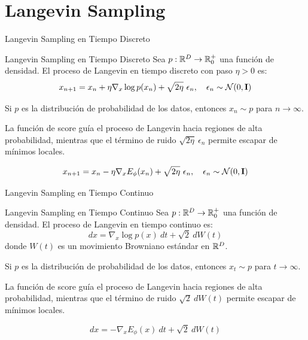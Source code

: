 \documentclass{beamer}
\begin{document}
\section{Langevin Sampling}

\begin{frame}{Langevin Sampling en Tiempo Discreto}
    \begin{definitionblock}{Langevin Sampling en Tiempo Discreto}
        Sea $p:\mathbb{R}^D\to \mathbb{R}^+_0$ una función de densidad. El proceso de Langevin en tiempo discreto con paso $\eta>0$ es:
        \begin{equation*}
            x_{n+1} = x_n + \eta \nabla_x \log p(x_n) + \sqrt{2\eta}\ \epsilon_n, \quad \epsilon_n\sim \mathcal{N}(0, \mathbf{I})
        \end{equation*}
    \end{definitionblock}
    
    Si $p$ es la distribución de probabilidad de los datos, entonces $x_n\sim p$ para $n\to \infty$.\pause

    La función de score guía el proceso de Langevin hacia regiones de alta probabilidad, mientras que el término de ruido $\sqrt{2\eta}\ \epsilon_n$ permite escapar de mínimos locales.\pause

    \begin{equation*}
        x_{n+1} = x_n - \eta \nabla_x E_\phi(x_n) + \sqrt{2\eta}\ \epsilon_n, \quad \epsilon_n\sim \mathcal{N}(0, \mathbf{I})
    \end{equation*}
    
\end{frame}

\begin{frame}{Langevin Sampling en Tiempo Continuo}
    \begin{definitionblock}{Langevin Sampling en Tiempo Continuo}
        Sea $p:\mathbb{R}^D\to \mathbb{R}^+_0$ una función de densidad. El proceso de Langevin en tiempo continuo es:
        \begin{equation*}
            dx = \nabla_x \log p(x)\ dt + \sqrt{2}\ dW(t)
        \end{equation*}
        donde $W(t)$ es un movimiento Browniano estándar en $\mathbb{R}^D$.
    \end{definitionblock}

    Si $p$ es la distribución de probabilidad de los datos, entonces $x_t\sim p$ para $t\to \infty$.\pause

    La función de score guía el proceso de Langevin hacia regiones de alta probabilidad, mientras que el término de ruido $\sqrt{2}\ dW(t)$ permite escapar de mínimos locales.\pause

    \begin{equation*}
        dx = -\nabla_x E_\phi(x)\ dt + \sqrt{2}\ dW(t)
    \end{equation*}
    
\end{frame}
\end{document}

